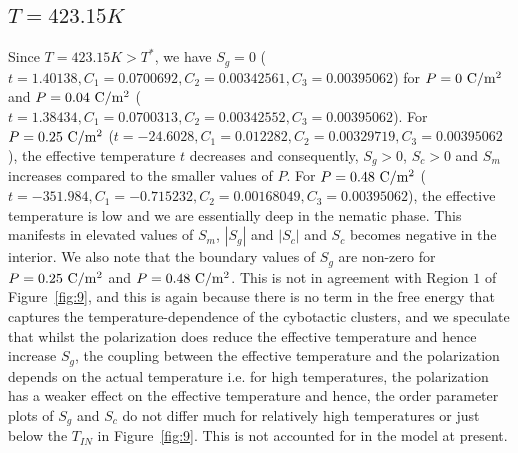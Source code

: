 \documentclass[reprint,amsfonts,amsmath,amssymb,aps,pre,floatfix,10pt]{revtex4-1}
\begin{document}
\subsection{$T = 423.15 K$}

Since $T =423.15 K > T^*$, we have $S_g = 0$ ($t =1.40138, C_1 =0.0700692, C_2 =0.00342561, C_3 =0.00395062$) for $P = 0 ~\rm{C}/\rm{m}^2$ and $P = 0.04 ~\rm{C}/\rm{m}^2$ ($t =1.38434, C_1 =0.0700313, C_2 =0.00342552, C_3 =0.00395062$).
 For $P = 0.25 ~ \rm{C}/\rm{m}^2$ ($t =-24.6028, C_1 =0.012282, C_2 =0.00329719, C_3 =0.00395062$), the effective temperature $t$ decreases and consequently, $S_g > 0$, $S_c>0$ and $S_m$ increases compared to the smaller values of $P$.  For $P = 0.48 ~\rm{C}/\rm{m}^2$ ($t =-351.984, C_1 =-0.715232, C_2 =0.00168049, C_3 =0.00395062$), the effective temperature is low and we are essentially deep in the nematic phase. This manifests in elevated values of $S_m$, $|S_g|$ and $|S_c|$ and $S_c$ becomes negative in the interior. We also note that the boundary values of $S_g$ are non-zero for $P = 0.25 ~\rm{C}/\rm{m}^2$ and $P = 0.48 ~\rm{C}/\rm{m}^2$. This is not in agreement with Region $1$ of Figure~\ref{fig:9}, and this is again because there is no term in the free energy that captures the temperature-dependence of the cybotactic clusters, and we speculate that whilst the polarization does reduce the effective temperature and hence increase $S_g$, the coupling between the effective temperature and the polarization depends on the actual temperature i.e. for high temperatures, the polarization has a weaker effect on the effective temperature and hence, the order parameter plots of $S_g$ and $S_c$ do not differ much for relatively high temperatures or just below the $T_{IN}$ in Figure~\ref{fig:9}. This is not accounted for in the model at present.
\end{document}

